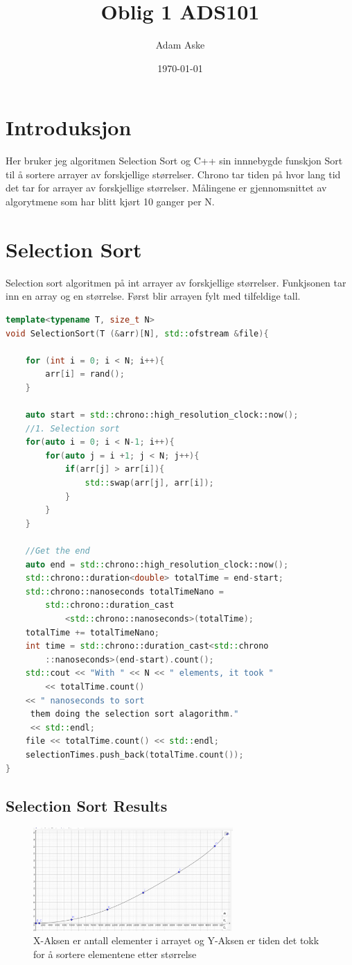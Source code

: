 \documentclass[a4paper,norsk]{article}
\title{Oblig 1 ADS101}
\date{\today}
\author{Adam Aske}
\begin{document}
\maketitle
\tableofcontents
\newpage

\section{Introduksjon}
Her bruker jeg algoritmen Selection Sort og C++ sin innnebygde funskjon Sort til å sortere arrayer av forskjellige størrelser. 
Chrono tar tiden på hvor lang tid det tar for arrayer av forskjellige størrelser. 
Målingene er gjennomsnittet av algorytmene som har blitt kjørt 10 ganger per N.

\section{Selection Sort}Selection sort algoritmen på int arrayer av forskjellige størrelser.
Funkjsonen tar inn en array og en størrelse. Først blir arrayen fylt med tilfeldige tall. 
\begin{lstlisting}[language=C++, caption={main.cpp}]
template<typename T, size_t N>
void SelectionSort(T (&arr)[N], std::ofstream &file){

    for (int i = 0; i < N; i++){
        arr[i] = rand();
    }

    auto start = std::chrono::high_resolution_clock::now();
    //1. Selection sort
    for(auto i = 0; i < N-1; i++){
        for(auto j = i +1; j < N; j++){
            if(arr[j] > arr[i]){
                std::swap(arr[j], arr[i]);
            }
        }
    }

    //Get the end
    auto end = std::chrono::high_resolution_clock::now();
    std::chrono::duration<double> totalTime = end-start;
    std::chrono::nanoseconds totalTimeNano = 
    	std::chrono::duration_cast
    		<std::chrono::nanoseconds>(totalTime);
    totalTime += totalTimeNano;
    int time = std::chrono::duration_cast<std::chrono
		::nanoseconds>(end-start).count();
    std::cout << "With " << N << " elements, it took " 
		<< totalTime.count() 
    << " nanoseconds to sort
	 them doing the selection sort alagorithm."
	 << std::endl;
    file << totalTime.count() << std::endl;
    selectionTimes.push_back(totalTime.count());
}
\end{lstlisting}
\subsection{Selection Sort Results}
\begin{figure}
\centering
	\includegraphics[width =3in]{SelectionSortGraph.png}
	\caption{X-Aksen er antall elementer i arrayet og Y-Aksen er tiden det tokk for å sortere elementene etter størrelse}
\end{figure}
\newpage
\end{document}
